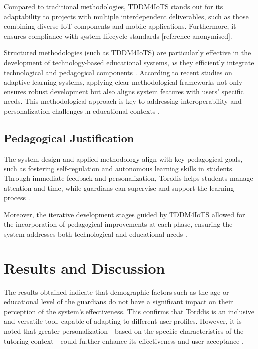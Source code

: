                 Compared to traditional methodologies, TDDM4IoTS stands out for its adaptability to projects with multiple interdependent deliverables, such as those combining diverse IoT components and mobile applications. Furthermore, it ensures compliance with system lifecycle standards [reference anonymised].
                
                Structured methodologies (such as TDDM4IoTS) are particularly effective in the development of technology-based educational systems, as they efficiently integrate technological and pedagogical components \citep{Borte2024Learning,Kirkwood2014Technology}. According to recent studies on adaptive learning systems, applying clear methodological frameworks not only ensures robust development but also aligns system features with users’ specific needs. This methodological approach is key to addressing interoperability and personalization challenges in educational contexts \citep{Wang2025Development}.
                
                \subsection{Pedagogical Justification}
                The system design and applied methodology align with key pedagogical goals, such as fostering self-regulation and autonomous learning skills in students. Through immediate feedback and personalization, Torddis helps students manage attention and time, while guardians can supervise and support the learning process \citep{Chen2025Unpacking}.
                
                Moreover, the iterative development stages guided by TDDM4IoTS allowed for the incorporation of pedagogical improvements at each phase, ensuring the system addresses both technological and educational needs \citep{Huang2025How}.
                
                \section{Results and Discussion}
                \label{section:sixth}
                The results obtained indicate that demographic factors such as the age or educational level of the guardians do not have a significant impact on their perception of the system’s effectiveness. This confirms that Torddis is an inclusive and versatile tool, capable of adapting to different user profiles. However, it is noted that greater personalization—based on the specific characteristics of the tutoring context—could further enhance its effectiveness and user acceptance \citep{Conati2021Toward}.
                
